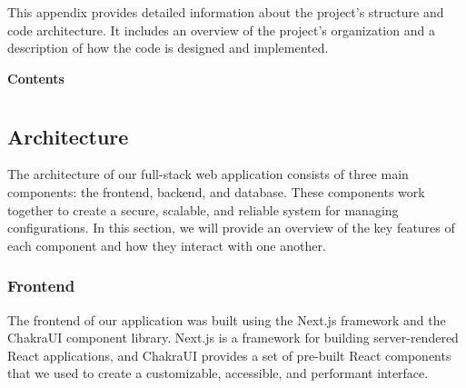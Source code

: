 \renewcommand{\thesection}{E.\arabic{section}}
\renewcommand{\thesubsection}{\arabic{subsection}}


This appendix provides detailed information about the project’s structure and code architecture. It includes an overview of the project’s organization and a description of how the code is designed and implemented.

\vspace{1.5cm}

\startcontents[chapters]

\textbf{\Large Contents}
\vspace{0.5cm}

\newpage


\section*{}

\subsection{Architecture}
The architecture of our full-stack web application consists of three main components: the frontend, backend, and database. These components work together to create a secure, scalable, and reliable system for managing configurations. In this section, we will provide an overview of the key features of each component and how they interact with one another.

\subsubsection{Frontend}
The frontend of our application was built using the Next.js framework and the ChakraUI component library. Next.js is a framework for building server-rendered React applications, and ChakraUI provides a set of pre-built React components that we used to create a customizable, accessible, and performant interface. \\

